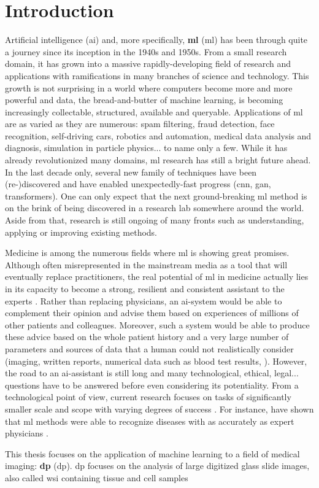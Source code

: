 \chapter{Introduction}

Artificial intelligence (\acrshort{ai}) and, more specifically, \textbf{\acrlong{ml}} (\acrshort{ml}) has been through quite a journey since its inception in the 1940s and 1950s. From a small research domain, it has grown into a massive rapidly-developing field of research and applications with ramifications in many branches of science and technology. This growth is not surprising in a world where computers become more and more powerful and data, the bread-and-butter of machine learning, is becoming increasingly collectable, structured, available and queryable. Applications of \acrshort{ml} are as varied as they are numerous: spam filtering, fraud detection, face recognition, self-driving cars, robotics and automation, medical data analysis and diagnosis, simulation in particle physics... to name only a few. While it has already revolutionized many domains, \acrshort{ml} research has still a bright future ahead. In the last decade only, several new family of techniques have been (re-)discovered and have enabled unexpectedly-fast progress (\eg \acrlong{cnn}, \acrlong{gan}, transformers). One can only expect that the next ground-breaking \acrshort{ml} method is on the brink of being discovered in a research lab somewhere around the world. Aside from that, research is still ongoing of many fronts such as understanding, applying or improving existing methods.

Medicine is among the numerous fields where \acrshort{ml} is showing great promises. Although often misrepresented in the mainstream media as a tool that will eventually replace practitioners, the real potential of \acrshort{ml} in medicine actually lies in its capacity to become a strong, resilient and consistent assistant to the experts \parencite{rajkomar2019machine}. Rather than replacing physicians, an \acrshort{ai}-system would be able to complement their opinion and advise them based on experiences of millions of other patients and colleagues. Moreover, such a system would be able to produce these advice based on the whole patient history and a very large number of parameters and sources of data that a human could not realistically consider (imaging, written reports, numerical data such as blood test results, \etc). However, the road to an \acrshort{ai}-assistant is still long and many technological, ethical, legal... questions have to be answered before even considering its potentiality. From a technological point of view, current research focuses on tasks of significantly smaller scale and scope with {\color{red} varying degrees of success} . For instance,  \parencite{esteva2017dermatologist,gulshan2016development} have shown that \acrshort{ml} methods were able to recognize diseases with as accurately as expert physicians . 

This thesis focuses on the application of machine learning to a field of medical imaging: \textbf{\acrlong{dp}} (\acrshort{dp}). \acrshort{dp} focuses on the analysis of large digitized glass slide images, also called \acrlong{wsi} containing tissue and cell samples